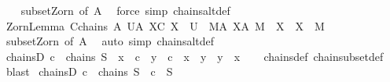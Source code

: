 \begin{isabellebody}
%
\isadelimproof
\ \ %
\endisadelimproof
%
\isatagproof
{}\isamarkupfalse%
\ subset{\isacharunderscore}{\kern0pt}Zorn{\isacharprime}{\kern0pt}\ {\isacharbrackleft}{\kern0pt}of\ A{\isacharbrackright}{\kern0pt}\ \isamarkupfalse%
\ {\isacharparenleft}{\kern0pt}force\ simp{\isacharcolon}{\kern0pt}\ chains{\isacharunderscore}{\kern0pt}alt{\isacharunderscore}{\kern0pt}def{\isacharparenright}{\kern0pt}%
\endisatagproof
{\isafoldproof}%
%
\isadelimproof
\isanewline
%
\endisadelimproof
\isanewline
{}\isamarkupfalse%
\ Zorn{\isacharunderscore}{\kern0pt}Lemma{}{\isacharcolon}{\kern0pt}\ {\isachardoublequoteopen}{\isasymforall}C{\isasymin}chains\ A{\isachardot}{\kern0pt}\ {\isasymexists}U{\isasymin}A{\isachardot}{\kern0pt}\ {\isasymforall}X{\isasymin}C{\isachardot}{\kern0pt}\ X\ {\isasymsubseteq}\ U\ {\isasymLongrightarrow}\ {\isasymexists}M{\isasymin}A{\isachardot}{\kern0pt}\ {\isasymforall}X{\isasymin}A{\isachardot}{\kern0pt}\ M\ {\isasymsubseteq}\ X\ {\isasymlongrightarrow}\ X\ {\isacharequal}{\kern0pt}\ M{\isachardoublequoteclose}\isanewline
%
\isadelimproof
\ \ %
\endisadelimproof
%
\isatagproof
{}\isamarkupfalse%
\ subset{\isacharunderscore}{\kern0pt}Zorn\ {\isacharbrackleft}{\kern0pt}of\ A{\isacharbrackright}{\kern0pt}\ \isamarkupfalse%
\ {\isacharparenleft}{\kern0pt}auto\ simp{\isacharcolon}{\kern0pt}\ chains{\isacharunderscore}{\kern0pt}alt{\isacharunderscore}{\kern0pt}def{\isacharparenright}{\kern0pt}%
\endisatagproof
{\isafoldproof}%
%
\isadelimproof
%
\endisadelimproof
%
\isadelimdocument
%
\endisadelimdocument
%
\isatagdocument
%
\isamarkuptrue%
%
\endisatagdocument
{\isafolddocument}%
%
\isadelimdocument
%
\endisadelimdocument
{}\isamarkupfalse%
\ chainsD{\isacharcolon}{\kern0pt}\ {\isachardoublequoteopen}c\ {\isasymin}\ chains\ S\ {\isasymLongrightarrow}\ x\ {\isasymin}\ c\ {\isasymLongrightarrow}\ y\ {\isasymin}\ c\ {\isasymLongrightarrow}\ x\ {\isasymsubseteq}\ y\ {\isasymor}\ y\ {\isasymsubseteq}\ x{\isachardoublequoteclose}\isanewline
%
\isadelimproof
\ \ %
\endisadelimproof
%
\isatagproof
{}\isamarkupfalse%
\ chains{\isacharunderscore}{\kern0pt}def\ chain{\isacharunderscore}{\kern0pt}subset{\isacharunderscore}{\kern0pt}def\ \isamarkupfalse%
\ blast%
\endisatagproof
{\isafoldproof}%
%
\isadelimproof
\isanewline
%
\endisadelimproof
\isanewline
{}\isamarkupfalse%
\ chainsD{}{\isacharcolon}{\kern0pt}\ {\isachardoublequoteopen}c\ {\isasymin}\ chains\ S\ {\isasymLongrightarrow}\ c\ {\isasymsubseteq}\ S{\isachardoublequoteclose}\isanewline

\end{isabellebody}
